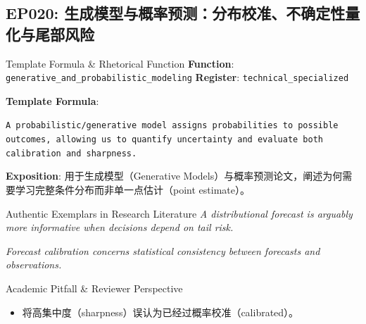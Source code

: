 \subsection{EP020: 生成模型与概率预测：分布校准、不确定性量化与尾部风险}\label{sec:ep:EP020}
\begin{ConceptBox}{Template Formula \& Rhetorical Function}
\textbf{Function}: \texttt{generative\_and\_probabilistic\_modeling} \quad \textbf{Register}: \texttt{technical\_specialized}\par\vspace{3pt}
\textbf{Template Formula}:\par\noindent\texttt{A probabilistic/generative model assigns probabilities to possible outcomes, allowing us to quantify uncertainty and evaluate both calibration and sharpness.}\par\vspace{4pt}
\textbf{Exposition}: 用于生成模型（Generative Models）与概率预测论文，阐述为何需要学习完整条件分布而非单一点估计（point estimate）。
\end{ConceptBox}
\begin{ExampleBox}{Authentic Exemplars in Research Literature}
\textit{A distributional forecast is arguably more informative when decisions depend on tail risk.}\par\vspace{2pt}
\textit{Forecast calibration concerns statistical consistency between forecasts and observations.}\par\vspace{2pt}
\end{ExampleBox}
\begin{TipBox}{Academic Pitfall \& Reviewer Perspective}
\begin{itemize}[leftmargin=1.5em, itemsep=1pt]
  \item 将高集中度（sharpness）误认为已经过概率校准（calibrated）。
\end{itemize}
\end{TipBox}
\vspace{6pt}
